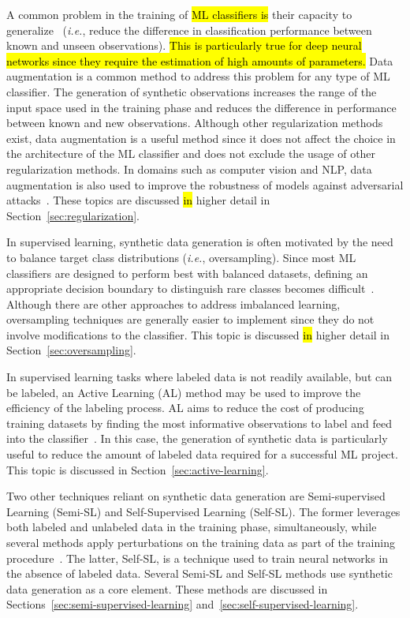 A common problem in the training of \hl{ML classifiers is} their
capacity to generalize~\cite{Zhang2021} (\textit{i.e.}, reduce the difference
in classification performance between known and unseen observations). \hl{This
is particularly true for deep neural networks since they require the
estimation of high amounts of parameters.} Data augmentation is a common
method to address this problem for any type of ML classifier. The generation
of synthetic observations increases the range of the input space used in the
training phase and reduces the difference in performance between known and new
observations. Although other regularization methods exist, data augmentation
is a useful method since it does not affect the choice in the architecture of
the ML classifier and does not exclude the usage of other regularization
methods. In domains such as computer vision and NLP, data augmentation is also
used to improve the robustness of models against adversarial
attacks~\cite{zeng2020data, morris2020textattack}. These topics are discussed
\hl{in} higher detail in Section~\ref{sec:regularization}.

In supervised learning, synthetic data generation is often motivated by the
need to balance target class distributions (\textit{i.e.}, oversampling).
Since most ML classifiers are designed to perform best with balanced datasets,
defining an appropriate decision boundary to distinguish rare classes becomes
difficult~\cite{saez2016analyzing}. Although there are other approaches to
address imbalanced learning, oversampling techniques are generally easier to
implement since they do not involve modifications to the classifier. This
topic is discussed \hl{in} higher detail in Section~\ref{sec:oversampling}.

In supervised learning tasks where labeled data is not readily available, but
can be labeled, an Active Learning (AL) method may be used to improve the
efficiency of the labeling process. AL aims to reduce the cost of producing
training datasets by finding the most informative observations to label and
feed into the classifier~\cite{fonseca2021increasing}. In this case, the
generation of synthetic data is particularly useful to reduce the amount of
labeled data required for a successful ML project. This topic is discussed in
Section~\ref{sec:active-learning}.

Two other techniques reliant on synthetic data generation are Semi-supervised
Learning (Semi-SL) and Self-Supervised Learning (Self-SL). The former
leverages both labeled and unlabeled data in the training phase,
simultaneously, while several methods apply perturbations on the training data
as part of the training procedure~\cite{van2020survey}. The latter, Self-SL,
is a technique used to train neural networks in the absence of labeled data.
Several Semi-SL and Self-SL methods use synthetic data generation as a core
element. These methods are discussed in
Sections~\ref{sec:semi-supervised-learning}
and~\ref{sec:self-supervised-learning}.


